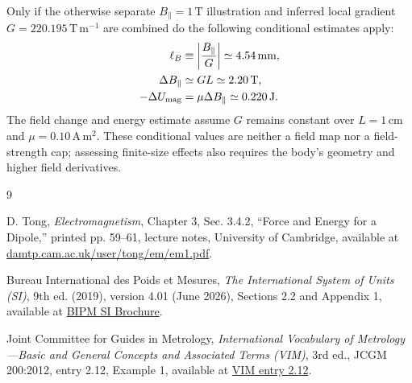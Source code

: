 \documentclass[12pt]{article}
\begin{document}
Only if the otherwise separate $B_{\parallel}=1\,\mathrm T$ illustration and inferred local gradient $G=220.195\,\mathrm{T\,m^{-1}}$ are combined do the following conditional estimates apply:
\begin{align*}
  \ell_B&\equiv\left|\frac{B_{\parallel}}{G}\right|\simeq4.54\,\mathrm{mm},\\
  \Delta B_{\parallel}&\simeq GL\simeq2.20\,\mathrm T,\\
  -\Delta U_{\rm mag}&=\mu\Delta B_{\parallel}\simeq0.220\,\mathrm J.
\end{align*}
The field change and energy estimate assume $G$ remains constant over $L=1\,\mathrm{cm}$ and $\mu=0.10\,\mathrm{A\,m^2}$. These conditional values are neither a field map nor a field-strength cap; assessing finite-size effects also requires the body's geometry and higher field derivatives.

\begin{thebibliography}{9}
\small
{}
\raggedright
{}

D. Tong,
\emph{Electromagnetism},
Chapter 3, Sec. 3.4.2, ``Force and Energy for a Dipole,'' printed pp. 59--61,
lecture notes, University of Cambridge,
available at \href{https://www.damtp.cam.ac.uk/user/tong/em/em1.pdf}{damtp.cam.ac.uk/user/tong/em/em1.pdf}.

Bureau International des Poids et Mesures,
\emph{The International System of Units (SI)},
9th ed. (2019), version 4.01 (June 2026), Sections 2.2 and Appendix 1,
available at \href{https://www.bipm.org/documents/20126/41483022/SI-Brochure-9-EN.pdf/2d2b50bf-f2b4-9661-f402-5f9d66e4b507}{BIPM SI Brochure}.

Joint Committee for Guides in Metrology,
\emph{International Vocabulary of Metrology---Basic and General Concepts and Associated Terms (VIM)},
3rd ed., JCGM 200:2012, entry 2.12, Example 1,
available at \href{https://jcgm.bipm.org/vim/en/2.12.html}{VIM entry 2.12}.

\end{thebibliography}
\end{document}
